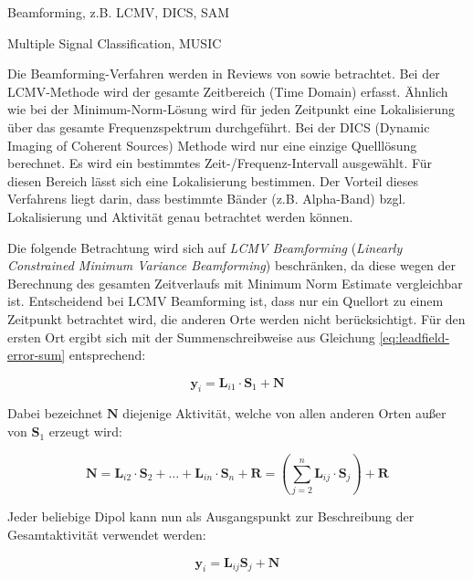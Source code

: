 \documentclass[doc,a4paper,12pt]{apa6}
\newcommand{\mx}[1]{\mathbf{#1}}
\begin{document}
\begin{compactitem}
\item Beamforming, z.B. LCMV, DICS, SAM
\item Multiple Signal Classification, MUSIC
\end{compactitem}

Die Beamforming-Verfahren werden in Reviews von \textcite{hillebrand2005beamformer} sowie \textcite{hillebrand2005new} betrachtet. Bei der LCMV-Methode \parencite{van1997localization} wird der gesamte Zeitbereich (Time Domain) erfasst. Ähnlich wie bei der Minimum-Norm-Lösung wird für jeden Zeitpunkt eine Lokalisierung über das gesamte Frequenzspektrum durchgeführt. Bei der DICS (Dynamic Imaging of Coherent Sources) Methode wird nur eine einzige Quelllösung berechnet. Es wird ein bestimmtes Zeit-/Frequenz-Intervall ausgewählt. Für diesen Bereich lässt sich eine Lokalisierung bestimmen. Der Vorteil dieses Verfahrens liegt darin, dass bestimmte Bänder (z.B. Alpha-Band) bzgl. Lokalisierung und Aktivität genau betrachtet werden können.

Die folgende Betrachtung wird sich auf \emph{LCMV Beamforming} (\emph{Linearly Constrained Minimum Variance Beamforming}) beschränken, da diese wegen der Berechnung des gesamten Zeitverlaufs mit Minimum Norm Estimate vergleichbar ist. Entscheidend bei LCMV Beamforming ist, dass nur ein Quellort zu einem Zeitpunkt betrachtet wird, die anderen Orte werden nicht berücksichtigt. Für den ersten Ort ergibt sich mit der Summenschreibweise aus Gleichung \ref{eq:leadfield-error-sum} entsprechend:

\begin{equation}
\mx{y}_i = \mx{L}_{i1} \cdot \mx{S}_1 + \mx{N}
\end{equation}

Dabei bezeichnet $\mx{N}$ diejenige Aktivität, welche von allen anderen Orten außer von $\mx{S}_1$ erzeugt wird:

\begin{equation}
\mx{N} = \mx{L}_{i2} \cdot \mx{S}_2 + \ldots + \mx{L}_{in} \cdot \mx{S}_n + \mx{R} = \left( \sum_{j=2}^n \mx{L}_{ij} \cdot \mx{S}_j \right) + \mx{R}
\end{equation}

Jeder beliebige Dipol kann nun als Ausgangspunkt zur Beschreibung der Gesamtaktivität verwendet werden:

\begin{equation}
\label{eq:beam}
\mx{y}_i = \mx{L}_{ij} \mx{S}_j + \mx{N}
\end{equation}
\end{document}
